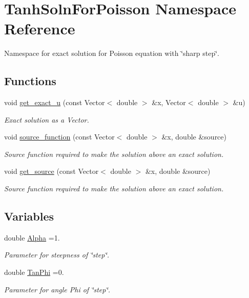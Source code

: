 \hypertarget{namespaceTanhSolnForPoisson}{}\section{Tanh\+Soln\+For\+Poisson Namespace Reference}
\label{namespaceTanhSolnForPoisson}


Namespace for exact solution for Poisson equation with \char`\"{}sharp step\char`\"{}.  


\subsection*{Functions}
\begin{DoxyCompactItemize}
\item 
void \hyperlink{namespaceTanhSolnForPoisson_af7896e9c18ce6438c73ae2a875e8b7de}{get\+\_\+exact\+\_\+u} (const Vector$<$ double $>$ \&x, Vector$<$ double $>$ \&u)
\begin{DoxyCompactList}\small\item\em Exact solution as a Vector. \end{DoxyCompactList}\item 
void \hyperlink{namespaceTanhSolnForPoisson_a967bc28320e02534beb714846b63e251}{source\+\_\+function} (const Vector$<$ double $>$ \&x, double \&source)
\begin{DoxyCompactList}\small\item\em Source function required to make the solution above an exact solution. \end{DoxyCompactList}\item 
void \hyperlink{namespaceTanhSolnForPoisson_ae1b9d6789ff301e3d63a4e292213036c}{get\+\_\+source} (const Vector$<$ double $>$ \&x, double \&source)
\begin{DoxyCompactList}\small\item\em Source function required to make the solution above an exact solution. \end{DoxyCompactList}\end{DoxyCompactItemize}
\subsection*{Variables}
\begin{DoxyCompactItemize}
\item 
double \hyperlink{namespaceTanhSolnForPoisson_ae676ccd186d5df119cce811596d949c1}{Alpha} =1.
\begin{DoxyCompactList}\small\item\em Parameter for steepness of \char`\"{}step\char`\"{}. \end{DoxyCompactList}\item 
double \hyperlink{namespaceTanhSolnForPoisson_a785ccd00a727125a5138fbbcac173294}{Tan\+Phi} =0.
\begin{DoxyCompactList}\small\item\em Parameter for angle Phi of \char`\"{}step\char`\"{}. \end{DoxyCompactList}\end{DoxyCompactItemize}


